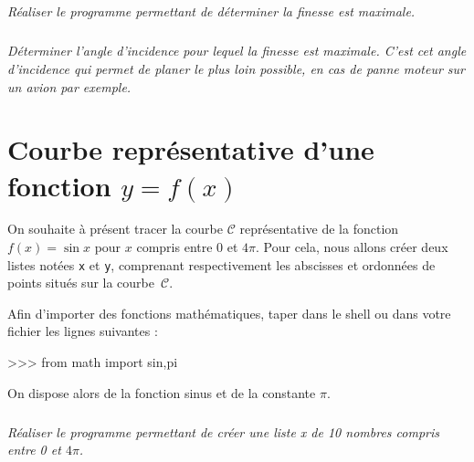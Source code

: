 \documentclass[10pt]{article}
\begin{document}
\subparagraph{}
\textit{Réaliser le programme permettant de déterminer la finesse est maximale.}

\subparagraph{}
\textit{Déterminer l'angle d'incidence pour lequel la finesse est maximale.
  C'est cet angle d'incidence qui permet de planer le plus loin possible, en cas de panne moteur sur un avion par exemple.}




\section{Courbe représentative d'une fonction $y=f(x)$}
\setcounter{subparagraph}{0}
On souhaite à présent tracer la courbe $\mathcal{C}$ représentative de la fonction $f(x)=\sin x$ pour $x$ compris entre 0 et $4\pi$. Pour cela, nous allons créer deux listes notées \texttt{x} et \texttt{y}, comprenant respectivement les abscisses et ordonnées de points situés sur la courbe~$\mathcal{C}$.



\begin{py}
Afin d'importer des fonctions mathématiques, taper dans le shell ou dans votre fichier les lignes suivantes : 
\begin{python}
>>> from math import sin,pi
\end{python}

On dispose alors de la fonction sinus et de la constante $\pi$.
\end{py}


\subparagraph{}
\textit{Réaliser le programme permettant de créer une liste \textsl{x} de 10 nombres compris entre 0 et $4\pi$.}



\end{document}
